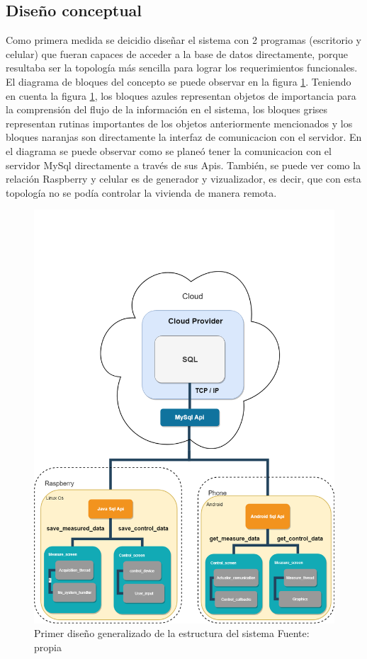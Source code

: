 \subsection{Diseño conceptual}
Como primera medida se deicidio diseñar el sistema con 2 programas (escritorio y celular) que fueran capaces de acceder a la base de datos directamente, porque resultaba ser la topología más sencilla para lograr los requerimientos funcionales. El diagrama de bloques del concepto se puede observar en la figura \ref{primier_diagramaGeneralizado}. Teniendo en cuenta la figura \ref{primier_diagramaGeneralizado}, los bloques azules representan objetos de importancia para la comprensión del flujo de la información en el sistema, los bloques grises representan rutinas importantes de los objetos anteriormente mencionados y los bloques naranjas son directamente la interfaz de comunicacion con el servidor. En el diagrama se puede observar como se planeó tener la comunicacion con el servidor MySql directamente a través de sus Apis. También, se puede ver como la relación Raspberry y celular es de generador y vizualizador, es decir, que con esta topología no se podía controlar la vivienda de manera remota.
\vspace{0.5cm}\\

\begin{figure}[htbp]
	\centering
	\includegraphics[width=15cm]{figuras/first_GeneralDiagram.png}
	\caption{Primer diseño generalizado de la estructura del sistema Fuente: propia}	
	\label{primier_diagramaGeneralizado}
\end{figure}

